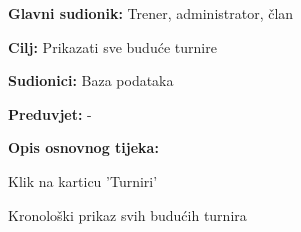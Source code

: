 					\eject
					
					\noindent {}
					\begin{packed_item}
	
						\item \textbf{Glavni sudionik: }Trener, administrator, član
						\item  \textbf{Cilj: } Prikazati sve buduće turnire
						\item  \textbf{Sudionici: } Baza podataka
						\item  \textbf{Preduvjet: } -
						\item  \textbf{Opis osnovnog tijeka:}
						
						\item[] \begin{packed_enum}
	
							\item Klik na karticu 'Turniri'
							\item Kronološki prikaz svih budućih turnira
						\end{packed_enum}
					\end{packed_item}
					
